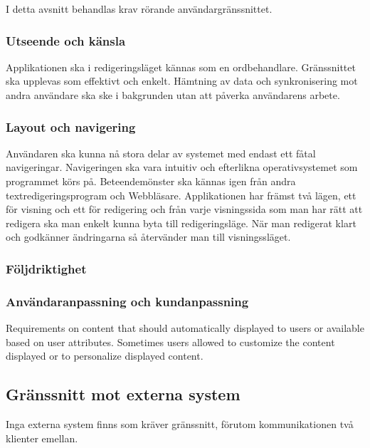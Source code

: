 I detta avsnitt behandlas krav rörande användargränssnittet.

\subsubsection{Utseende och känsla}
Applikationen ska i redigeringsläget kännas som en ordbehandlare. Gränssnittet ska upplevas som effektivt och enkelt. Hämtning av data och synkronisering mot andra användare ska ske i bakgrunden utan att påverka användarens arbete.

\subsubsection{Layout och navigering}
Användaren ska kunna nå stora delar av systemet med endast ett fåtal navigeringar. Navigeringen ska vara intuitiv och efterlikna operativsystemet som programmet körs på. Beteendemönster ska kännas igen från andra textredigeringsprogram och Webbläsare. Applikationen har främst två lägen, ett för visning och ett för redigering och från varje visningssida som man har rätt att redigera ska man enkelt kunna byta till redigeringsläge. När man redigerat klart och godkänner ändringarna så återvänder man till visningssläget.

\subsubsection{Följdriktighet} %

\subsubsection{Användaranpassning och kundanpassning}
Requirements on content that should automatically displayed to users or available based on user attributes. Sometimes users allowed to customize the content displayed or to personalize displayed content.

\subsection{Gränssnitt mot externa system}
Inga externa system finns som kräver gränssnitt, förutom kommunikationen två klienter emellan.

